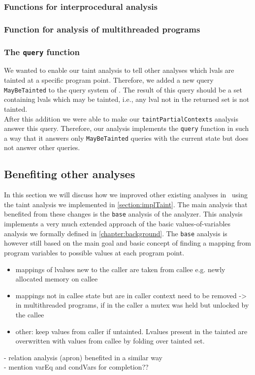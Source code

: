     \subsubsection{Functions for interprocedural analysis}

    \subsubsection{Function for analysis of multithreaded programs}

    \subsubsection{The \texttt{query} function}
      We wanted to enable our taint analysis to tell other analyses which \ac{lval}s are tainted at a specific program point. Therefore, we added a new query \texttt{MayBeTainted} to the query system of \gob. The result of this query should be a set containing \ac{lval}s which may be tainted, i.e., any \ac{lval} not in the returned set is not tainted.\\
      After this addition we were able to make our \texttt{taintPartialContexts} analysis answer this query. Therefore, our analysis implements the \texttt{query} function in such a way that it answers only \texttt{MayBeTainted} queries with the current state but does not answer other queries.

    \subsection{Benefiting other analyses}
    In this section we will discuss how we improved other existing analyses in \gob\ using the taint analysis we implemented in \autoref{section:implTaint}. The main analysis that benefited from these changes is the \texttt{base} analysis of the analyzer. This analysis implements a very much extended approach of the basic values-of-variables analysis we formally defined in \autoref{chapter:background}. The \texttt{base} analysis is however still based on the main goal and basic concept of finding a mapping from program variables to possible values at each program point.


    \begin{itemize}
      \item mappings of lvalues new to the caller are taken from callee e.g. newly allocated memory on callee
      \item mappings not in callee state but are in caller context need to be removed -> in multithreaded programs, if in the caller a mutex was held but unlocked by the callee
      \item other: keep values from caller if untainted. Lvalues present in the tainted are overwritten with values from callee by folding over tainted set.
    \end{itemize}
    - relation analysis (apron) benefited in a similar way\\
    - mention varEq and condVars for completion??\\

